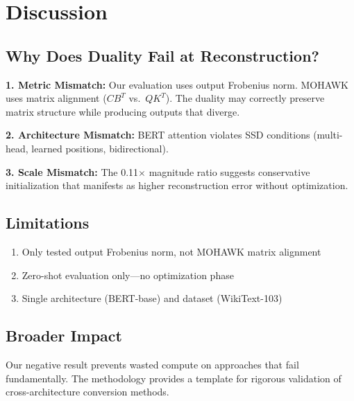 \section{Discussion}
\label{sec:discussion}

\subsection{Why Does Duality Fail at Reconstruction?}

\textbf{1. Metric Mismatch:} Our evaluation uses output Frobenius norm. MOHAWK uses matrix alignment ($CB^T$ vs.\ $QK^T$). The duality may correctly preserve matrix structure while producing outputs that diverge.

\textbf{2. Architecture Mismatch:} BERT attention violates SSD conditions (multi-head, learned positions, bidirectional).

\textbf{3. Scale Mismatch:} The 0.11$\times$ magnitude ratio suggests conservative initialization that manifests as higher reconstruction error without optimization.

\subsection{Limitations}

\begin{enumerate}
    \item Only tested output Frobenius norm, not MOHAWK matrix alignment
    \item Zero-shot evaluation only---no optimization phase
    \item Single architecture (BERT-base) and dataset (WikiText-103)
\end{enumerate}

\subsection{Broader Impact}

Our negative result prevents wasted compute on approaches that fail fundamentally. The methodology provides a template for rigorous validation of cross-architecture conversion methods.
